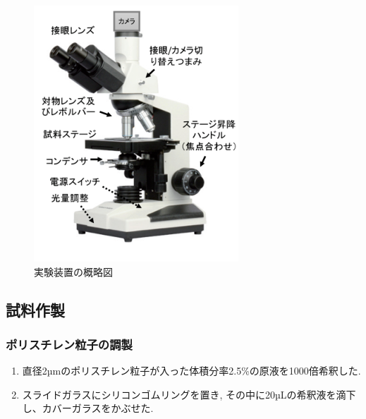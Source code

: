 \documentclass[11pt]{ltjsarticle}
\begin{document}
      \begin{minipage}{0.38\textwidth}
        \begin{figure}[H]
          \centering
          \includegraphics[width=\textwidth]{kigu.png}
          \caption{実験装置の概略図}
          \label{fig:setup}
        \end{figure}
      \end{minipage}
        \newpage
    \subsection*{試料作製}
      \subsubsection*{ポリスチレン粒子の調製}
      \begin{enumerate}
        \item 直径2µmのポリスチレン粒子が入った体積分率2.5\%の原液を1000倍希釈した.
        \item スライドガラスにシリコンゴムリングを置き, その中に20µLの希釈液を滴下し、カバーガラスをかぶせた.
      \end{enumerate}
\end{document}
